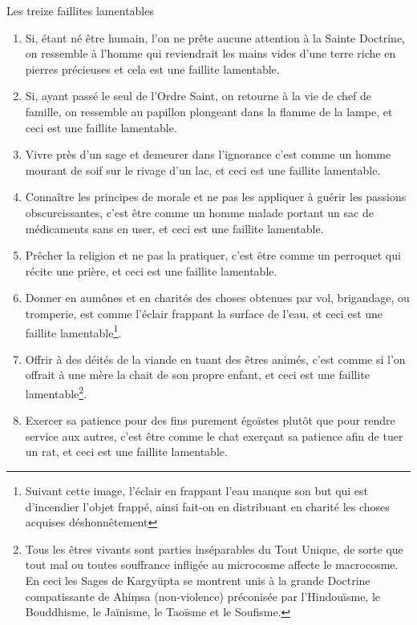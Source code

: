 \documentclass[10pt]{book}
\makeatletter
\renewcommand{\section}{\@startsection{section}{0}{0mm}
   {\baselineskip}
   {\baselineskip}{\normalfont\normalsize\scshape\centering}
}
\makeatother
\begin{document}
\section{Les treize faillites lamentables}
\begin{enumerate}[1.-]
\item Si, étant né être humain, l'on ne prête aucune attention à la Sainte Doctrine, on ressemble à l'homme qui reviendrait les mains vides d'une terre riche en pierres précieuses et cela est une faillite lamentable.
\item Si, ayant passé le seul de l'Ordre Saint, on retourne à la vie de chef de famille, on ressemble au papillon plongeant dans la flamme de la lampe, et ceci est une faillite lamentable.
\item Vivre près d'un sage et demeurer dans l'ignorance c'est comme un homme mourant de soif sur le rivage d'un lac, et ceci est une faillite lamentable.
\item Connaître les principes de morale et ne pas les appliquer à guérir les passions obscurcissantes, c'est être comme un homme malade portant un sac de médicaments sans en user, et ceci est une faillite lamentable.
\item Prêcher la religion et ne pas la pratiquer, c'est être comme un perroquet qui récite une prière, et ceci est une faillite lamentable.
\item Donner en aumônes et en charités des choses obtenues par vol, brigandage, ou tromperie, est comme l'éclair frappant la surface de l'eau, et ceci est une faillite lamentable\footnote{Suivant cette image, l'éclair en frappant l'eau manque son but qui est d'incendier l'objet frappé, ainsi fait-on en distribuant en charité les choses acquises déshonnêtement}.
\item Offrir à des déités de la viande en tuant des êtres animés, c'est comme si l'on offrait à une mère la chait de son propre enfant, et ceci est une faillite lamentable\footnote{Tous les êtres vivants sont parties inséparables du Tout Unique, de sorte que tout mal ou toutes souffrance infligée au microcosme affecte le macrocosme. En ceci les Sages de Kargyüpta se montrent unis à la grande Doctrine compatissante de Ahiṃsa (non-violence) préconisée par l'Hindouïsme, le Bouddhisme, le Jaïnisme, le Taoïsme et le Soufisme.}.
\item Exercer sa patience pour des fins purement égoïstes plutôt que pour rendre service aux autres, c'est être comme le chat exerçant sa patience afin de tuer un rat, et ceci est une faillite lamentable.

\end{enumerate}
\end{document}
